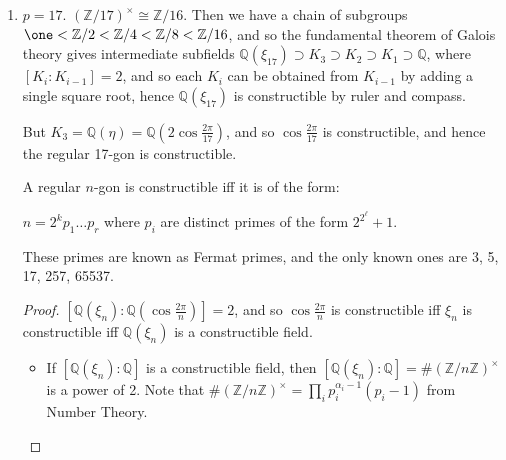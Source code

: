 \documentclass[a4paper, 10pt, twocolumn]{amsart}
\begin{document}
\begin{enumerate}
\begin{enumerate}
\begin{proof}[Proof 2.]
Then $f'(x) = \sim_{i=1}^{n}  (x-\alpha_1)\ldots(x-\alpha_{i-1})(x-alpha_{i+1})\ldots(x-\alpha_n)$\\
Hence $f'(\alpha_i) = (\alpha_i-\alpha_1)\ldots(\alpha_i-\alpha_{i-1})(\alpha_i-\alpha_{i+1})\ldots(\alpha_i-\alpha_n)$\\
So $f'(a\alpha_1)\ldots f'(\alpha_n) = \prod_{i \neq j} (\alpha_i-\alpha_j) = (-1)^{p(p-1)/2} \prod_{i<j} (\alpha_i-\alpha_j)^2 = \Delta(f)$
\end{proof}
\begin{corollary}
Take $f(x) = x^p-1$, so that $f'(x) = px^{p-1}$. Then $\Delta(f) = (-1)^{p(p-1)/2} p^p \xi^{(1+2+\ldots +p-1)(p-1)} = \pm 1 p^p = (-1)^{(p-1)/2} p^p$
\end{corollary}
$\mathbb{Q}(\sqrt{\Delta})$ is always a quadratic extension of $\mathbb{Q}$ contained in $\mathbb{Q}(\xi_p)$, and there is a unique root, so we're done.
\begin{corollary}
$\aut(\mathbb{Q}_p(\xi_p)/\mathbb{Q}) \not\subseteq A_n$.
\end{corollary}
\item $p=17$. $(\mathbb{Z}/17)^{\times} \cong \mathbb{Z}/16$. Then we have a chain of subgroups $\one < \mathbb{Z}/2 < \mathbb{Z}/4 < \mathbb{Z}/8 < \mathbb{Z}/16$, and so the fundamental theorem of Galois theory gives intermediate subfields $\mathbb{Q}(\xi_{17}) \supset K_3 \supset K_2 \supset K_1 \supset \mathbb{Q}$, where $[K_i: K_{i-1}] = 2$, and so each $K_i$ can be obtained from $K_{i-1}$ by adding a single square root, hence $\mathbb{Q}(\xi_17)$ is constructible by ruler and compass.

But $K_3 = \mathbb{Q}(\eta) = \mathbb{Q}(2\cos \frac{2\pi}{17})$, and so $\cos \frac{2\pi}{17}$ is constructible, and hence the regular 17-gon is constructible.
\begin{theorem}[Gauss]
A regular $n$-gon is constructible iff it is of the form:
\begin{center}
$n = 2^k p_1\ldots p_r$ where $p_i$ are distinct primes of the form $2^{2^\ell} + 1$.
\end{center}
These primes are known as Fermat primes, and the only known ones are 3, 5, 17, 257, 65537.
\end{theorem}
\begin{proof}
$[\mathbb{Q}(\xi_n):\mathbb{Q}(\cos\frac{2\pi}{n})] = 2$, and so $\cos \frac{2\pi}{n}$ is constructible iff $\xi_n$ is constructible iff $\mathbb{Q}(\xi_n)$ is a constructible field.
\begin{itemize}
\item[\underline{$\implies$:}] If $[\mathbb{Q}(\xi_n):\mathbb{Q}]$ is a constructible field, then $[\mathbb{Q}(\xi_n):\mathbb{Q}] = \#(\mathbb{Z}/n\mathbb{Z})^{\times}$ is a power of 2. Note that $\#(\mathbb{Z}/n\mathbb{Z})^{\times} = \prod_i p_i^{\alpha_i-1}(p_i-1)$ from Number Theory.


\end{itemize}
\end{proof}
\end{enumerate}
\end{enumerate}
\end{document}
